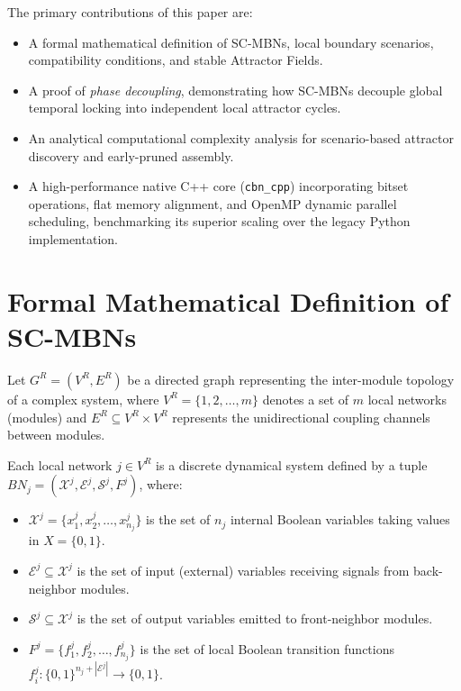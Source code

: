 \documentclass{svproc}
\begin{document}
The primary contributions of this paper are:
\begin{itemize}
    \item A formal mathematical definition of SC-MBNs, local boundary scenarios, compatibility conditions, and stable Attractor Fields.
    \item A proof of \emph{phase decoupling}, demonstrating how SC-MBNs decouple global temporal locking into independent local attractor cycles.
    \item An analytical computational complexity analysis for scenario-based attractor discovery and early-pruned assembly.
    \item A high-performance native C++ core (\texttt{cbn\_cpp}) incorporating bitset operations, flat memory alignment, and OpenMP dynamic parallel scheduling, benchmarking its superior scaling over the legacy Python implementation.
\end{itemize}

\section{Formal Mathematical Definition of SC-MBNs}

Let $G^R = (V^R, E^R)$ be a directed graph representing the inter-module topology of a complex system, where $V^R = \{1, 2, \dots, m\}$ denotes a set of $m$ local networks (modules) and $E^R \subseteq V^R \times V^R$ represents the unidirectional coupling channels between modules.

\begin{definition}
Each local network $j \in V^R$ is a discrete dynamical system defined by a tuple $BN_j = (\mathcal{X}^j, \mathcal{E}^j, \mathcal{S}^j, F^j)$, where:
\begin{itemize}
    \item $\mathcal{X}^j = \{x_1^j, x_2^j, \dots, x_{n_j}^j\}$ is the set of $n_j$ internal Boolean variables taking values in $X = \{0, 1\}$.
    \item $\mathcal{E}^j \subseteq \mathcal{X}^j$ is the set of input (external) variables receiving signals from back-neighbor modules.
    \item $\mathcal{S}^j \subseteq \mathcal{X}^j$ is the set of output variables emitted to front-neighbor modules.
    \item $F^j = \{f_1^j, f_2^j, \dots, f_{n_j}^j\}$ is the set of local Boolean transition functions $f_i^j: \{0,1\}^{n_j + |\mathcal{E}^j|} \to \{0,1\}$.
\end{itemize}
\end{definition}
\end{document}
